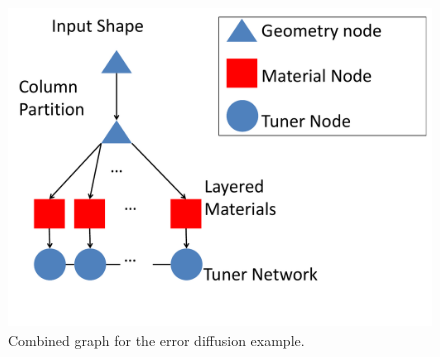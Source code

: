 \documentclass[annual]{acmsiggraph}
\begin{document}
\begin{figure}[h]
\includegraphics[scale=0.3]{figure/netAndTuner.pdf}
\caption{Combined graph for the error diffusion example.}
\label{fig:combine}
\end{figure}
\end{document}
